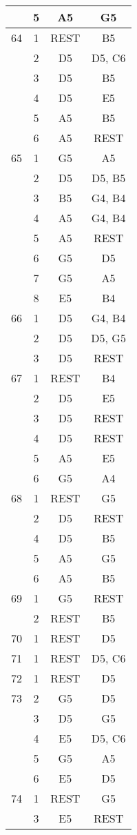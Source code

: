 \documentclass{article}
\begin{document}
\begin{longtable}{|c|c|c|c|}
  & 5 & A5 & G5 \\ 
\hline
64 & 1 & REST & B5 \\ 
  & 2 & D5 & D5, C6 \\ 
  & 3 & D5 & B5 \\ 
  & 4 & D5 & E5 \\ 
  & 5 & A5 & B5 \\ 
  & 6 & A5 & REST \\ 
\hline
65 & 1 & G5 & A5 \\ 
  & 2 & D5 & D5, B5 \\ 
  & 3 & B5 & G4, B4 \\ 
  & 4 & A5 & G4, B4 \\ 
  & 5 & A5 & REST \\ 
  & 6 & G5 & D5 \\ 
  & 7 & G5 & A5 \\ 
  & 8 & E5 & B4 \\ 
\hline
66 & 1 & D5 & G4, B4 \\ 
  & 2 & D5 & D5, G5 \\ 
  & 3 & D5 & REST \\ 
\hline
67 & 1 & REST & B4 \\ 
  & 2 & D5 & E5 \\ 
  & 3 & D5 & REST \\ 
  & 4 & D5 & REST \\ 
  & 5 & A5 & E5 \\ 
  & 6 & G5 & A4 \\ 
\hline
68 & 1 & REST & G5 \\ 
  & 2 & D5 & REST \\ 
  & 4 & D5 & B5 \\ 
  & 5 & A5 & G5 \\ 
  & 6 & A5 & B5 \\ 
\hline
69 & 1 & G5 & REST \\ 
  & 2 & REST & B5 \\ 
\hline
70 & 1 & REST & D5 \\ 
\hline
71 & 1 & REST & D5, C6 \\ 
\hline
72 & 1 & REST & D5 \\ 
\hline
73 & 2 & G5 & D5 \\ 
  & 3 & D5 & G5 \\ 
  & 4 & E5 & D5, C6 \\ 
  & 5 & G5 & A5 \\ 
  & 6 & E5 & D5 \\ 
\hline
74 & 1 & REST & G5 \\ 
  & 3 & E5 & REST \\ 

\end{longtable}
\end{document}
